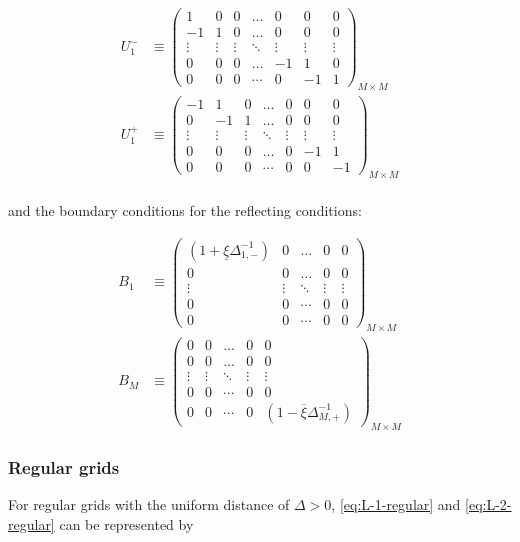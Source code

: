 \documentclass[11pt]{article}
\theoremstyle{definition}
\begin{document}
\begin{align}
U_1^{-} &\equiv \begin{pmatrix}
1  &0&0&\dots&0&0&0\\
-1&1&0&\dots&0&0&0\\
\vdots&\vdots&\vdots&\ddots&\vdots&\vdots&\vdots\\
0&0&0&\dots&-1&1&0\\
0&0&0&\cdots&0&-1&1
\end{pmatrix}_{M\times M}\label{eq:L-1-basis} \\
U_1^{+} &\equiv \begin{pmatrix}
-1  &1&0&\dots&0&0&0\\
0&-1&1&\dots&0&0&0\\
\vdots&\vdots&\vdots&\ddots&\vdots&\vdots&\vdots\\
0&0&0&\dots&0&-1&1\\
0&0&0&\cdots&0&0&-1
\end{pmatrix}_{M\times M}\label{eq:L-1+-basis} \\
\end{align}

and the boundary conditions for the reflecting conditions:

\begin{align}
B_{1}  &\equiv \begin{pmatrix}
(1 + \underline{\xi} \Delta^{-1}_{1,-}) &0&\dots&0&0\\
0&0&\dots&0&0\\
\vdots&\vdots&\ddots&\vdots&\vdots\\
0&0&\cdots&0&0\\
0&0&\cdots&0&0
\end{pmatrix}_{M\times M} \\
B_{M}  &\equiv \begin{pmatrix}
0 &0&\dots&0&0\\
0&0&\dots&0&0\\
\vdots&\vdots&\ddots&\vdots&\vdots\\
0&0&\cdots&0&0\\
0&0&\cdots&0&(1 - \overline{\xi} \Delta^{-1}_{M,+})
\end{pmatrix}_{M\times M}
\end{align}

\subsubsection{Regular grids}
For regular grids with the uniform distance of $\Delta > 0$, \eqref{eq:L-1-regular} and \eqref{eq:L-2-regular} can be represented by
\end{document}
